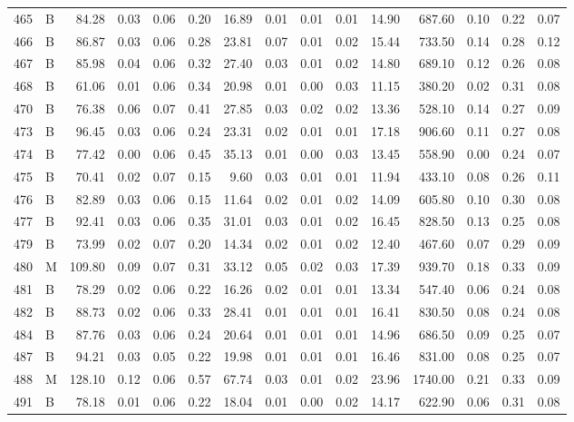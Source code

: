 \begin{table}[ht]
\begin{tabular}{rlrrrrrrrrrrrrr}
  465 & B & 84.28 & 0.03 & 0.06 & 0.20 & 16.89 & 0.01 & 0.01 & 0.01 & 14.90 & 687.60 & 0.10 & 0.22 & 0.07 \\ 
  466 & B & 86.87 & 0.03 & 0.06 & 0.28 & 23.81 & 0.07 & 0.01 & 0.02 & 15.44 & 733.50 & 0.14 & 0.28 & 0.12 \\ 
  467 & B & 85.98 & 0.04 & 0.06 & 0.32 & 27.40 & 0.03 & 0.01 & 0.02 & 14.80 & 689.10 & 0.12 & 0.26 & 0.08 \\ 
  468 & B & 61.06 & 0.01 & 0.06 & 0.34 & 20.98 & 0.01 & 0.00 & 0.03 & 11.15 & 380.20 & 0.02 & 0.31 & 0.08 \\ 
  470 & B & 76.38 & 0.06 & 0.07 & 0.41 & 27.85 & 0.03 & 0.02 & 0.02 & 13.36 & 528.10 & 0.14 & 0.27 & 0.09 \\ 
  473 & B & 96.45 & 0.03 & 0.06 & 0.24 & 23.31 & 0.02 & 0.01 & 0.01 & 17.18 & 906.60 & 0.11 & 0.27 & 0.08 \\ 
  474 & B & 77.42 & 0.00 & 0.06 & 0.45 & 35.13 & 0.01 & 0.00 & 0.03 & 13.45 & 558.90 & 0.00 & 0.24 & 0.07 \\ 
  475 & B & 70.41 & 0.02 & 0.07 & 0.15 & 9.60 & 0.03 & 0.01 & 0.01 & 11.94 & 433.10 & 0.08 & 0.26 & 0.11 \\ 
  476 & B & 82.89 & 0.03 & 0.06 & 0.15 & 11.64 & 0.02 & 0.01 & 0.02 & 14.09 & 605.80 & 0.10 & 0.30 & 0.08 \\ 
  477 & B & 92.41 & 0.03 & 0.06 & 0.35 & 31.01 & 0.03 & 0.01 & 0.02 & 16.45 & 828.50 & 0.13 & 0.25 & 0.08 \\ 
  479 & B & 73.99 & 0.02 & 0.07 & 0.20 & 14.34 & 0.02 & 0.01 & 0.02 & 12.40 & 467.60 & 0.07 & 0.29 & 0.09 \\ 
  480 & M & 109.80 & 0.09 & 0.07 & 0.31 & 33.12 & 0.05 & 0.02 & 0.03 & 17.39 & 939.70 & 0.18 & 0.33 & 0.09 \\ 
  481 & B & 78.29 & 0.02 & 0.06 & 0.22 & 16.26 & 0.02 & 0.01 & 0.01 & 13.34 & 547.40 & 0.06 & 0.24 & 0.08 \\ 
  482 & B & 88.73 & 0.02 & 0.06 & 0.33 & 28.41 & 0.01 & 0.01 & 0.01 & 16.41 & 830.50 & 0.08 & 0.24 & 0.08 \\ 
  484 & B & 87.76 & 0.03 & 0.06 & 0.24 & 20.64 & 0.01 & 0.01 & 0.01 & 14.96 & 686.50 & 0.09 & 0.25 & 0.07 \\ 
  487 & B & 94.21 & 0.03 & 0.05 & 0.22 & 19.98 & 0.01 & 0.01 & 0.01 & 16.46 & 831.00 & 0.08 & 0.25 & 0.07 \\ 
  488 & M & 128.10 & 0.12 & 0.06 & 0.57 & 67.74 & 0.03 & 0.01 & 0.02 & 23.96 & 1740.00 & 0.21 & 0.33 & 0.09 \\ 
  491 & B & 78.18 & 0.01 & 0.06 & 0.22 & 18.04 & 0.01 & 0.00 & 0.02 & 14.17 & 622.90 & 0.06 & 0.31 & 0.08 \\ 

\end{tabular}
\end{table}
